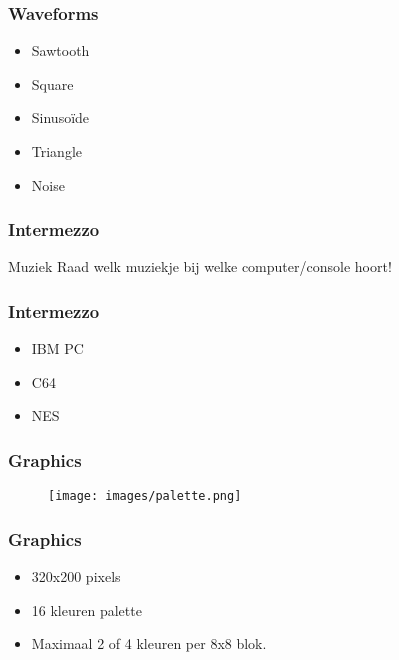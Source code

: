 \documentclass[aspectratio=43]{uva-inf-presentation}
\begin{document}

\begin{frame}
\frametitle{Waveforms}

\begin{itemize}
\item Sawtooth
\item Square
\item Sinuso\"ide
\item Triangle
\item Noise
\end{itemize}

\end{frame}


\begin{frame}
\frametitle{Intermezzo}

\begin{block}{Muziek}
Raad welk muziekje bij welke computer/console hoort!
\end{block}

\end{frame}


\begin{frame}
\frametitle{Intermezzo}

\begin{itemize}
\item IBM PC
\item C64
\item NES
\end{itemize}

\end{frame}


\begin{frame}
\frametitle{Graphics}

\begin{figure}
\texttt{[image: images/palette.png]}
\end{figure}

\end{frame}


\begin{frame}
\frametitle{Graphics}

\begin{itemize}
\item 320x200 pixels
\item 16 kleuren palette
\item Maximaal 2 of 4 kleuren per 8x8 blok.
\end{itemize}

\end{frame}
\end{document}
